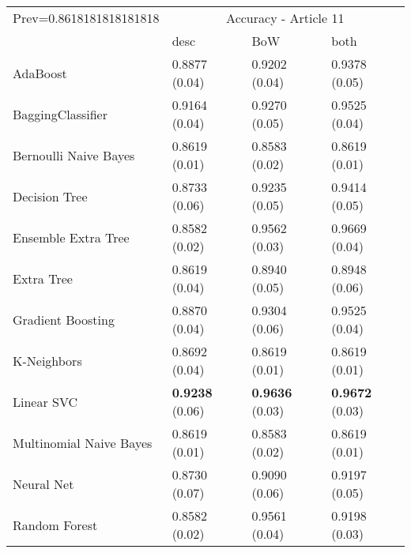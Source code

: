 \begin{tabular}{|l|l|l|l| }
\hline
Prev=0.8618181818181818 &  \multicolumn{3}{c|}{Accuracy - Article 11} \\
\cline{2-4} & desc & BoW & both \\ \hline
AdaBoost                & 0.8877 (0.04) & 0.9202 (0.04) & 0.9378 (0.05)\\
BaggingClassifier       & 0.9164 (0.04) & 0.9270 (0.05) & 0.9525 (0.04)\\
Bernoulli Naive Bayes   & 0.8619 (0.01) & 0.8583 (0.02) & 0.8619 (0.01)\\
Decision Tree           & 0.8733 (0.06) & 0.9235 (0.05) & 0.9414 (0.05)\\
Ensemble Extra Tree     & 0.8582 (0.02) & 0.9562 (0.03) & 0.9669 (0.04)\\
Extra Tree              & 0.8619 (0.04) & 0.8940 (0.05) & 0.8948 (0.06)\\
Gradient Boosting       & 0.8870 (0.04) & 0.9304 (0.06) & 0.9525 (0.04)\\
K-Neighbors             & 0.8692 (0.04) & 0.8619 (0.01) & 0.8619 (0.01)\\
Linear SVC              & {\bf 0.9238} (0.06) & {\bf 0.9636} (0.03) & {\bf 0.9672} (0.03)\\
Multinomial Naive Bayes & 0.8619 (0.01) & 0.8583 (0.02) & 0.8619 (0.01)\\
Neural Net              & 0.8730 (0.07) & 0.9090 (0.06) & 0.9197 (0.05)\\
Random Forest           & 0.8582 (0.02) & 0.9561 (0.04) & 0.9198 (0.03)\\
\hline
\end{tabular}